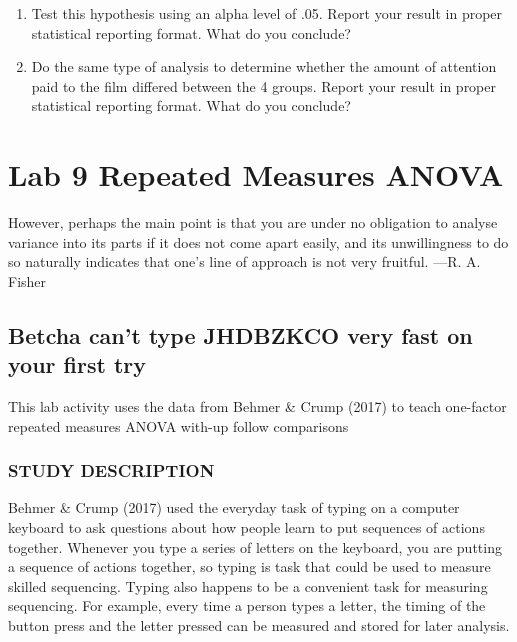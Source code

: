 \documentclass[
]{book}
\begin{document}
\begin{enumerate}
\def\labelenumi{\arabic{enumi}.}
\item
  Test this hypothesis using an alpha level of .05. Report your result in proper statistical reporting format. What do you conclude?
\item
  Do the same type of analysis to determine whether the amount of attention paid to the film differed between the 4 groups. Report your result in proper statistical reporting format. What do you conclude?
\end{enumerate}

\hypertarget{lab-9-repeated-measures-anova}{%
\chapter{Lab 9 Repeated Measures ANOVA}\label{lab-9-repeated-measures-anova}}

{However, perhaps the main point is that you are under no obligation to analyse variance into its parts if it does not come apart easily, and its unwillingness to do so naturally indicates that one's line of approach is not very fruitful. ---R. A. Fisher}

\hypertarget{betcha-cant-type-jhdbzkco-very-fast-on-your-first-try}{%
\section{Betcha can't type JHDBZKCO very fast on your first try}\label{betcha-cant-type-jhdbzkco-very-fast-on-your-first-try}}

This lab activity uses the data from Behmer \& Crump (2017) to teach one-factor repeated measures ANOVA with-up follow comparisons

\hypertarget{study-description-3}{%
\subsection{STUDY DESCRIPTION}\label{study-description-3}}

Behmer \& Crump (2017) used the everyday task of typing on a computer keyboard to ask questions about how people learn to put sequences of actions together. Whenever you type a series of letters on the keyboard, you are putting a sequence of actions together, so typing is task that could be used to measure skilled sequencing. Typing also happens to be a convenient task for measuring sequencing. For example, every time a person types a letter, the timing of the button press and the letter pressed can be measured and stored for later analysis.
\end{document}
